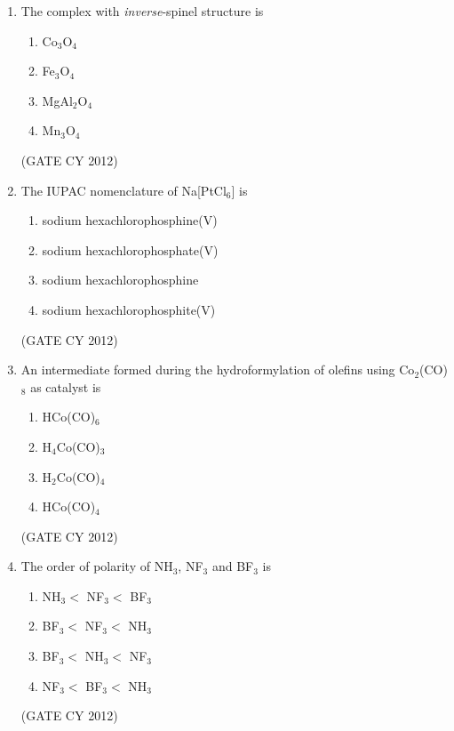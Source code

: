 \documentclass[12pt]{article}
\begin{document}
\begin{enumerate}
\item The complex with \textit{inverse}-spinel structure is
\begin{multicols}{2}
\begin{enumerate}
    \item Co$_3$O$_4$
    \item Fe$_3$O$_4$
    \item MgAl$_2$O$_4$
    \item Mn$_3$O$_4$
\end{enumerate}
\end{multicols}
\hfill (GATE CY 2012)

\item The IUPAC nomenclature of Na[PtCl$_6$] is
\begin{multicols}{2}
\begin{enumerate}
    \item sodium hexachlorophosphine(V)
    \item sodium hexachlorophosphate(V)
    \item sodium hexachlorophosphine
    \item sodium hexachlorophosphite(V)
\end{enumerate}
\end{multicols}
\hfill (GATE CY 2012)

\item An intermediate formed during the hydroformylation of olefins using Co$_2$(CO)$_8$ as catalyst is
\begin{multicols}{2}
\begin{enumerate}
    \item HCo(CO)$_6$
    \item H$_4$Co(CO)$_3$
    \item H$_2$Co(CO)$_4$
    \item HCo(CO)$_4$
\end{enumerate}
\end{multicols}
\hfill (GATE CY 2012)

\item The order of polarity of NH$_3$, NF$_3$ and BF$_3$ is
\begin{multicols}{2}
\begin{enumerate}
    \item NH$_3 <$ NF$_3 <$ BF$_3$
    \item BF$_3 <$ NF$_3 <$ NH$_3$
    \item BF$_3 <$ NH$_3 <$ NF$_3$
    \item NF$_3 <$ BF$_3 <$ NH$_3$
\end{enumerate}
\end{multicols}
\hfill (GATE CY 2012)


\end{enumerate}
\end{document}
